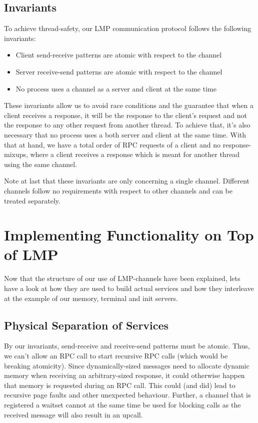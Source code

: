 \subsection{Invariants}
To achieve thread-safety, our LMP communication protocol 
follows the following invariants:
\begin{itemize}
    \item Client send-receive patterns are atomic with respect to the channel
    \item Server receive-send patterns are atomic with respect to the channel
    \item No process uses a channel as a server and client at the same time
\end{itemize}
These invariants allow us to avoid race conditions and the guarantee that 
when a client receives a response, it will be the response to the client's
request and not the response to any other request from another thread.
To achieve that, it's also necessary that no process uses a both server and client at the same time.
With that at hand, we have a total order of RPC requests of a client and no 
response-mixups, where a client receives a response which is meant for another thread using the same channel.

Note at last that these invariants are only concerning a single channel.
Different channels follow no requirements with respect to other channels 
and can be treated separately.

\section{Implementing Functionality on Top of LMP}
Now that the structure of our use of LMP-channels have been explained, 
lets have a look at how they are used to build actual services and how 
they interleave at the example of our memory, terminal and init servers.

\subsection{Physical Separation of Services}
By our invariants, send-receive and receive-send  patterns must be atomic. Thus, we can't allow an RPC call to 
start recursive RPC calls (which would be breaking atomicity). Since dynamically-sized messages 
need to allocate dynamic memory when receiving an arbitrary-sized response, 
it could otherwise happen that memory is requested during an RPC call.
This could (and did) lead to recursive page faults and other unexpected behaviour.
Further, a channel that is registered a waitset cannot at the same time be
used for blocking calls as the received message will also result in an upcall.

